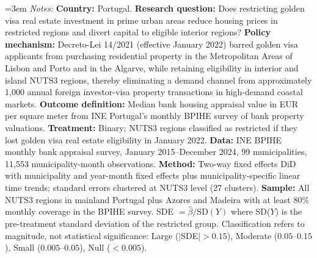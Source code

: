 \begin{table}[htbp]
\centering
\caption{Standardized Effect Sizes}
\label{tab:sde}
\vspace{0.5em}
\begin{minipage}{\textwidth}\emergencystretch=3em
\footnotesize
\textit{Notes:} \textbf{Country:} Portugal. \textbf{Research question:} Does restricting golden visa real estate investment in prime urban areas reduce housing prices in restricted regions and divert capital to eligible interior regions? \textbf{Policy mechanism:} Decreto-Lei 14/2021 (effective January 2022) barred golden visa applicants from purchasing residential property in the Metropolitan Areas of Lisbon and Porto and in the Algarve, while retaining eligibility in interior and island NUTS3 regions, thereby eliminating a demand channel from approximately 1,000 annual foreign investor-visa property transactions in high-demand coastal markets. \textbf{Outcome definition:} Median bank housing appraisal value in EUR per square meter from INE Portugal's monthly BPIHE survey of bank property valuations. \textbf{Treatment:} Binary; NUTS3 regions classified as restricted if they lost golden visa real estate eligibility in January 2022. \textbf{Data:} INE BPIHE monthly bank appraisal survey, January 2015--December 2024, 99 municipalities, 11,553 municipality-month observations. \textbf{Method:} Two-way fixed effects DiD with municipality and year-month fixed effects plus municipality-specific linear time trends; standard errors clustered at NUTS3 level (27 clusters). \textbf{Sample:} All NUTS3 regions in mainland Portugal plus Azores and Madeira with at least 80\% monthly coverage in the BPIHE survey. SDE $= \hat{\beta} / \text{SD}(Y)$ where SD($Y$) is the pre-treatment standard deviation of the restricted group. Classification refers to magnitude, not statistical significance: Large ($|$SDE$| > 0.15$), Moderate ($0.05$--$0.15$), Small ($0.005$--$0.05$), Null ($< 0.005$).
\end{minipage}
\end{table}
